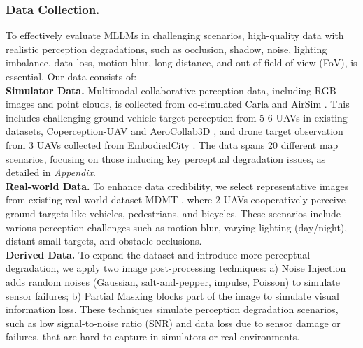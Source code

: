 \documentclass[letterpaper]{article} %
\begin{document}
\subsubsection{Data Collection.}
To effectively evaluate MLLMs in challenging scenarios, high-quality data with realistic perception degradations, such as occlusion, shadow, noise, lighting imbalance, data loss, motion blur, long distance, and out-of-field of view (FoV), is essential.
Our data consists of:
\\
\indent \textbf{Simulator Data.}
    Multimodal collaborative perception data, including RGB images and point clouds, is collected from co-simulated Carla \cite{dosovitskiy2017carla} and AirSim \cite{shah2017airsim}. This includes challenging ground vehicle target perception from 5-6 UAVs in existing datasets, Coperception-UAV \cite{hu2022where2comm} and AeroCollab3D \cite{tian2024ucdnet}, and drone target observation from 3 UAVs collected from EmbodiedCity \cite{gao2024embodiedcity}. The data spans 20 different map scenarios, focusing on those inducing key perceptual degradation issues, as detailed in \textit{Appendix}.
\\
\indent 
\textbf{Real-world Data.}
    To enhance data credibility, we select representative images from existing real-world dataset MDMT \cite{liu2023robust}, where 2 UAVs cooperatively perceive ground targets like vehicles, pedestrians, and bicycles. These scenarios include various perception challenges such as motion blur, varying lighting (day/night), distant small targets, and obstacle occlusions. 
\\
\indent
\textbf{Derived Data.}
    To expand the dataset and introduce more perceptual degradation, we apply two image post-processing techniques:
    a) Noise Injection adds random noises (Gaussian, salt-and-pepper, impulse, Poisson) to simulate sensor failures;
    b) Partial Masking blocks part of the image to simulate visual information loss.
    These techniques simulate perception degradation scenarios, such as low signal-to-noise ratio (SNR) and data loss due to sensor damage or failures, that are hard to capture in simulators or real environments.
\end{document}
